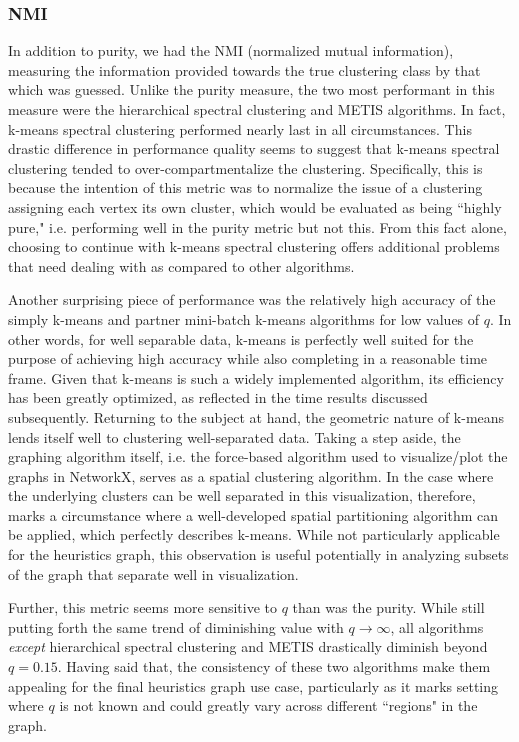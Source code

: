 \documentclass{article}
\begin{document}
\subsubsection{NMI}
In addition to purity, we had the NMI (normalized mutual information), measuring the information provided towards the true clustering class by that which was guessed. Unlike the purity measure, the two most performant in this measure were the hierarchical spectral clustering and METIS algorithms. In fact, k-means spectral clustering performed nearly last in all circumstances. This drastic difference in performance quality seems to suggest that k-means spectral clustering tended to over-compartmentalize the clustering. Specifically, this is because the intention of this metric was to normalize the issue of a clustering assigning each vertex its own cluster, which would be evaluated as being ``highly pure," i.e. performing well in the purity metric but not this. From this fact alone, choosing to continue with k-means spectral clustering offers additional problems that need dealing with as compared to other algorithms.

Another surprising piece of performance was the relatively high accuracy of the simply k-means and partner mini-batch k-means algorithms for low values of $q$. In other words, for well separable data, k-means is perfectly well suited for the purpose of achieving high accuracy while also completing in a reasonable time frame. Given that k-means is such a widely implemented algorithm, its efficiency has been greatly optimized, as reflected in the time results discussed subsequently. Returning to the subject at hand, the geometric nature of k-means lends itself well to clustering well-separated data. Taking a step aside, the graphing algorithm itself, i.e. the force-based algorithm used to visualize/plot the graphs in NetworkX, serves as a spatial clustering algorithm. In the case where the underlying clusters can be well separated in this visualization, therefore, marks a circumstance where a well-developed spatial partitioning algorithm can be applied, which perfectly describes k-means. While not particularly applicable for the heuristics graph, this observation is useful potentially in analyzing subsets of the graph that separate well in visualization.

Further, this metric seems more sensitive to $q$ than was the purity. While still putting forth the same trend of diminishing value with $q\rightarrow\infty$, all algorithms \textit{except} hierarchical spectral clustering and METIS drastically diminish beyond $q=0.15$. Having said that, the consistency of these two algorithms make them appealing for the final heuristics graph use case, particularly as it marks setting where $q$ is not known and could greatly vary across different ``regions" in the graph.
\end{document}
